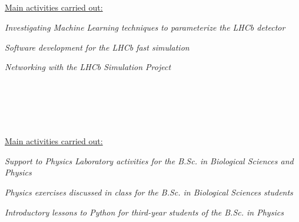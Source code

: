 \begin{cvcontent}
  \\ [5mm]
  \\ [0.5mm]
  \\ [1.5mm]
  \\ [1.5mm]
  {\normalsize \color{maincolor} \ul{Main activities carried out:}\\ [1.5mm]
  \begin{itemize*}[label=\textcolor{iconcolor}{\textbullet}]
    \item \emph{Investigating Machine Learning techniques to 
      parameterize the LHCb detector}\\ [0.5mm]
    \item \emph{Software development for the LHCb fast simulation}\\ [0.5mm]
    \item \emph{Networking with the LHCb Simulation Project}
  \end{itemize*}}
  \\ [5mm]
  \\ [0.5mm]
  \\ [1.5mm]
  \\ [1.5mm]
  {\normalsize \color{maincolor} \ul{Main activities carried out:}\\ [1.5mm]
  \begin{itemize*}[label=\textcolor{iconcolor}{\textbullet}]
    \item \emph{Support to Physics Laboratory activities for 
      the B.Sc. in Biological Sciences and Physics}\\ [0.5mm]
    \item \emph{Physics exercises discussed in class for the 
      B.Sc. in Biological Sciences students}\\ [0.5mm]
    \item \emph{Introductory lessons to Python for third-year 
      students of the B.Sc. in Physics}
  \end{itemize*}}
  \\ [5mm]
  \\ [0.5mm]

\end{cvcontent}
